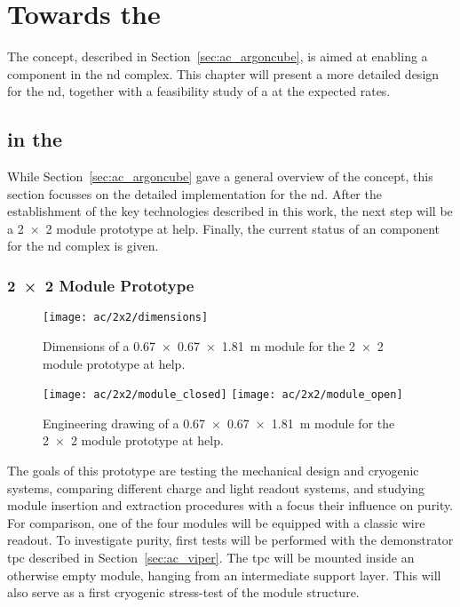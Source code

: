 \chapter{Towards the  }
\label{chap:dune-nd}

The \AC{} concept, described in Section~\ref{sec:ac_argoncube}, is aimed at enabling a \lartpc{} component in the \dune{} \gls{nd} complex.
This chapter will present a more detailed design for the \gls{nd}, together with a feasibility study of a \lartpc{} at the expected rates.


\section{\AC{} in the  }
\label{sec:dune-nd_ac}

While Section~\ref{sec:ac_argoncube} gave a general overview of the \AC{} concept, this section focusses on the detailed implementation for the \dune{} \gls{nd}.
After the establishment of the key technologies described in this work, the next step will be a \num{2 x 2} module prototype at \gls{help}.
Finally, the current status of an \AC{} \lartpc{} component for the \dune{} \gls{nd} complex is given.

\subsection{\num{2 x 2} Module Prototype}
\label{sec:dune-nd_ac_2x2}

\begin{figure}[htb]
	\centering
	\texttt{[image: ac/2x2/dimensions]}
	\caption{Dimensions of a \SI{0.67 x 0.67 x 1.81}{\metre} module for the \AC{} \num{2 x 2} module \AC{} prototype at \gls{help}.}
	\label{fig:2x2_dim}
\end{figure}

\begin{figure}[htb]
	\centering
	\texttt{[image: ac/2x2/module\_closed]}
	\texttt{[image: ac/2x2/module\_open]}
	\caption{Engineering drawing of a \SI{0.67 x 0.67 x 1.81}{\metre} module for the \AC{} \num{2 x 2} module \AC{} prototype at \gls{help}.}
	\label{fig:2x2_mod}
\end{figure}

The goals of this prototype are testing the mechanical design and cryogenic systems, comparing different charge and light readout systems, and studying module insertion and extraction procedures with a focus their influence on purity.
For comparison, one of the four modules will be equipped with a classic wire readout.
To investigate purity, first tests will be performed with the \AC{} demonstrator \gls{tpc} described in Section~\ref{sec:ac_viper}.
The \gls{tpc} will be mounted inside an otherwise empty module, hanging from an intermediate support layer.
This will also serve as a first cryogenic stress-test of the module structure.

